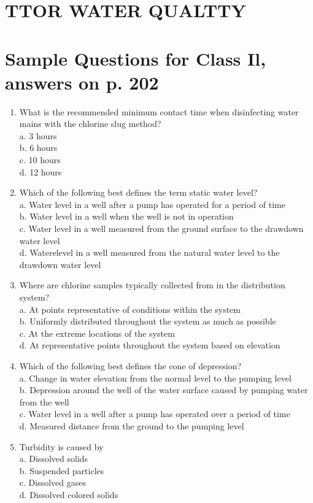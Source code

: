 \documentclass[10pt]{article}
\begin{document}
\section{TTOR WATER QUALTTY}
\section{Sample Questions for Class Il, answers on p. 202}
\begin{enumerate}
  \item What is the recommended minimum contact time when disinfecting water mains with the chlorine slug method?\\
a. 3 hours\\
b. 6 hours\\
c. 10 hours\\
d. 12 hours

  \item Which of the following best defines the term static water level?\\
a. Water level in a well after a pump has operated for a period of time\\
b. Water level in a well when the well is not in operation\\
c. Water level in a well measured from the ground surface to the drawdown water level\\
d. Waterelevel in a well measured from the natural water level to the drawdown water level

  \item Where are chlorine samples typically collected from in the distribution system?\\
a. At points representative of conditions within the system\\
b. Uniformly distributed throughout the system as much as possible\\
c. At the extreme locations of the system\\
d. At representative points throughout the system based on elevation

  \item Which of the following best defines the cone of depression?\\
a. Change in water elevation from the normal level to the pumping level\\
b. Depression around the well of the water surface caused by pumping water from the well\\
c. Water level in a well after a pump has operated over a period of time\\
d. Measured distance from the ground to the pumping level

  \item Turbidity is caused by\\
a. Dissolved solids\\
b. Suspended particles\\
c. Dissolved gases\\
d. Dissolved colored solids

\end{enumerate}
\end{document}
